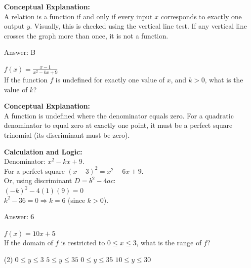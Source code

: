 \documentclass[11pt,paper=a4,answers]{exam}
\begin{document}
\begin{questions}
\begin{solution}
\textbf{Conceptual Explanation:} \\
A relation is a function if and only if every input $x$ corresponds to exactly one output $y$. Visually, this is checked using the vertical line test. If any vertical line crosses the graph more than once, it is not a function.

\vspace{30pt}

Answer: \colorbox{yellow!100}{B}
\end{solution}

\vspace{40pt}

\question
$f(x) = \frac{x-1}{x^2 - kx + 9}$ \\
If the function $f$ is undefined for exactly one value of $x$, and $k > 0$, what is the value of $k$?

\begin{solution}
\textbf{Conceptual Explanation:} \\
A function is undefined where the denominator equals zero. For a quadratic denominator to equal zero at exactly one point, it must be a perfect square trinomial (its discriminant must be zero).

\vspace{30pt}

\textbf{Calculation and Logic:} \\
Denominator: $x^2 - kx + 9$. \\
For a perfect square $(x-3)^2 = x^2 - 6x + 9$. \\
Or, using discriminant $D = b^2 - 4ac$: \\
$(-k)^2 - 4(1)(9) = 0$ \\
$k^2 - 36 = 0 \Rightarrow k = 6$ (since $k > 0$).

\vspace{30pt}

Answer: \colorbox{yellow!100}{6}
\end{solution}

\vspace{40pt}

\question
$f(x) = 10x + 5$ \\
If the domain of $f$ is restricted to $0 \leq x \leq 3$, what is the range of $f$?
\begin{tasks}(2)
    \task $0 \leq y \leq 3$
    \task $5 \leq y \leq 35$
    \task $0 \leq y \leq 35$
    \task $10 \leq y \leq 30$
\end{tasks}


\end{questions}
\end{document}
